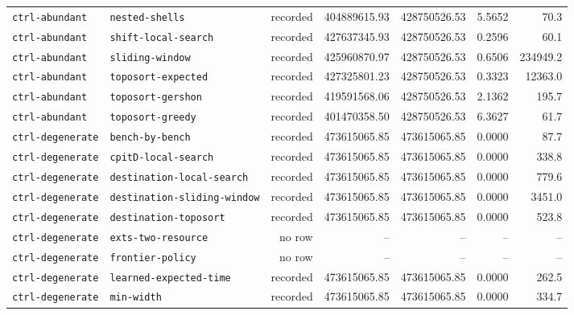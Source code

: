 \begin{longtable}{>{\raggedright\arraybackslash}p{}>{\raggedright\arraybackslash}p{}r r r r r}
\texttt{ctrl\allowbreak-abundant} & \texttt{nested\allowbreak-shells} & recorded & 404889615.93 & 428750526.53 & 5.5652 & 70.3 \\
\texttt{ctrl\allowbreak-abundant} & \texttt{shift\allowbreak-local\allowbreak-search} & recorded & 427637345.93 & 428750526.53 & 0.2596 & 60.1 \\
\texttt{ctrl\allowbreak-abundant} & \texttt{sliding\allowbreak-window} & recorded & 425960870.97 & 428750526.53 & 0.6506 & 234949.2 \\
\texttt{ctrl\allowbreak-abundant} & \texttt{toposort\allowbreak-expected} & recorded & 427325801.23 & 428750526.53 & 0.3323 & 12363.0 \\
\texttt{ctrl\allowbreak-abundant} & \texttt{toposort\allowbreak-gershon} & recorded & 419591568.06 & 428750526.53 & 2.1362 & 195.7 \\
\texttt{ctrl\allowbreak-abundant} & \texttt{toposort\allowbreak-greedy} & recorded & 401470358.50 & 428750526.53 & 6.3627 & 61.7 \\
\texttt{ctrl\allowbreak-degenerate} & \texttt{bench\allowbreak-by\allowbreak-bench} & recorded & 473615065.85 & 473615065.85 & 0.0000 & 87.7 \\
\texttt{ctrl\allowbreak-degenerate} & \texttt{cpitD\allowbreak-local\allowbreak-search} & recorded & 473615065.85 & 473615065.85 & 0.0000 & 338.8 \\
\texttt{ctrl\allowbreak-degenerate} & \texttt{destination\allowbreak-local\allowbreak-search} & recorded & 473615065.85 & 473615065.85 & 0.0000 & 779.6 \\
\texttt{ctrl\allowbreak-degenerate} & \texttt{destination\allowbreak-sliding\allowbreak-window} & recorded & 473615065.85 & 473615065.85 & 0.0000 & 3451.0 \\
\texttt{ctrl\allowbreak-degenerate} & \texttt{destination\allowbreak-toposort} & recorded & 473615065.85 & 473615065.85 & 0.0000 & 523.8 \\
\texttt{ctrl\allowbreak-degenerate} & \texttt{exts\allowbreak-two\allowbreak-resource} & no row & -- & -- & -- & -- \\
\texttt{ctrl\allowbreak-degenerate} & \texttt{frontier\allowbreak-policy} & no row & -- & -- & -- & -- \\
\texttt{ctrl\allowbreak-degenerate} & \texttt{learned\allowbreak-expected\allowbreak-time} & recorded & 473615065.85 & 473615065.85 & 0.0000 & 262.5 \\
\texttt{ctrl\allowbreak-degenerate} & \texttt{min\allowbreak-width} & recorded & 473615065.85 & 473615065.85 & 0.0000 & 334.7 \\

\end{longtable}
